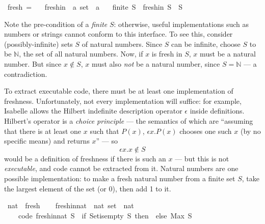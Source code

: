 \begin{implementation}
\isamarkupfalse%
\ fresh\ =\isanewline
\ \ \ fresh{\isacharunderscore}in\ {\isacharcolon}{\isacharcolon}\ {\isachardoublequoteopen}{\isacharprime}a\ set\ {\isasymRightarrow}\ {\isacharprime}a{\isachardoublequoteclose}\isanewline
\ \ \ {\isachardoublequoteopen}finite\ S\ {\isasymLongrightarrow}\ fresh{\isacharunderscore}in\ S\ {\isasymnotin}\ S{\isachardoublequoteclose}
\end{implementation}

Note the pre-condition of a \emph{finite} \(S\): otherwise, useful implementations such as numbers or strings cannot conform to this interface.
To see this, consider (possibly-infinite) sets \(S\) of natural numbers.
Since \(S\) can be infinite, choose \(S\) to be \(\mathbb{N}\), the set of all natural numbers.
Now, if \(x\) is fresh in \(S\), \(x\) must be a natural number.
But since \(x \notin S\), \(x\) must also \emph{not} be a natural number, since \(S = \mathbb{N}\) --- a contradiction.

To extract executable code, there must be at least one implementation of freshness.
Unfortunately, not every implementation will suffice: for example, Isabelle allows the Hilbert indefinite description operator \(\epsilon\) inside definitions.
Hilbert's operator is a \emph{choice principle} --- the semantics of which are ``assuming that there is at least one \(x\) such that \(P(x)\), \(\epsilon x. P(x)\) chooses one such \(x\) (by no specific means) and returns \(x\)'' --- so
\[
\epsilon x. x \notin S
\]
would be a definition of freshness if there is such an \(x\) --- but this is not \emph{executable}, and code cannot be extracted from it.
Natural numbers are one possible implementation: to make a fresh natural number from a finite set \(S\), take the largest element of the set (or 0), then add 1 to it.

\begin{implementation}
\isamarkupfalse%
\ nat\ {\isacharcolon}{\isacharcolon}\ fresh\isanewline
{}\isanewline
\ \ \isamarkupfalse%
\ fresh{\isacharunderscore}in{\isacharunderscore}nat\ {\isacharcolon}{\isacharcolon}\ {\isachardoublequoteopen}nat\ set\ {\isasymRightarrow}\ nat{\isachardoublequoteclose}\ \isanewline
\ \ \ \ {\isacharbrackleft}code{\isacharbrackright}{\isacharcolon}\ {\isachardoublequoteopen}fresh{\isacharunderscore}in{\isacharunderscore}nat\ S\ {\isasymequiv}\ {\isacharparenleft}if\ Set{\isachardot}is{\isacharunderscore}empty\ S\ then\ {}\ else\ Max\ S\ {\isacharplus}\ {}{\isacharparenright}{\isachardoublequoteclose}
\end{implementation}

